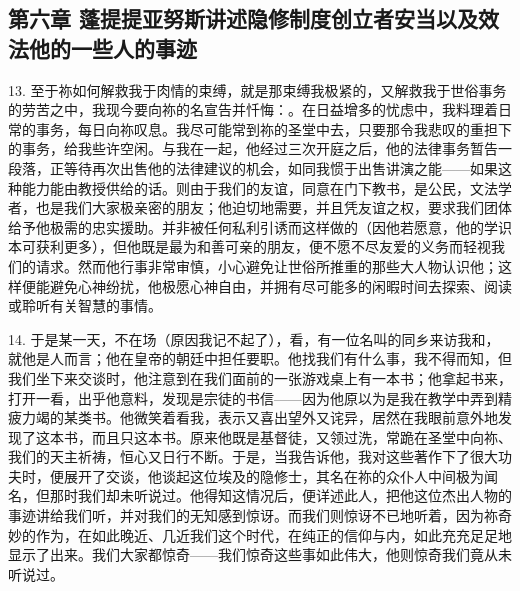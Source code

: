 
\subsection{第六章 蓬提提亚努斯讲述隐修制度创立者安当以及效法他的一些人的事迹}

13. 至于祢如何解救我于肉情的束缚，就是那束缚我极紧的，又解救我于世俗事务的劳苦之中，我现今要向祢的名宣告并忏悔：。在日益增多的忧虑中，我料理着日常的事务，每日向祢叹息。我尽可能常到祢的圣堂中去，只要那令我悲叹的重担下的事务，给我些许空闲。与我在一起，他经过三次开庭之后，他的法律事务暂告一段落，正等待再次出售他的法律建议的机会，如同我惯于出售讲演之能——如果这种能力能由教授供给的话。则由于我们的友谊，同意在门下教书，是公民，文法学者，也是我们大家极亲密的朋友；他迫切地需要，并且凭友谊之权，要求我们团体给予他极需的忠实援助。并非被任何私利引诱而这样做的（因他若愿意，他的学识本可获利更多），但他既是最为和善可亲的朋友，便不愿不尽友爱的义务而轻视我们的请求。然而他行事非常审慎，小心避免让世俗所推重的那些大人物认识他；这样便能避免心神纷扰，他极愿心神自由，并拥有尽可能多的闲暇时间去探索、阅读或聆听有关智慧的事情。\par

14. 于是某一天，不在场（原因我记不起了），看，有一位名叫的同乡来访我和，就他是人而言；他在皇帝的朝廷中担任要职。他找我们有什么事，我不得而知，但我们坐下来交谈时，他注意到在我们面前的一张游戏桌上有一本书；他拿起书来，打开一看，出乎他意料，发现是宗徒的书信——因为他原以为是我在教学中弄到精疲力竭的某类书。他微笑着看我，表示又喜出望外又诧异，居然在我眼前意外地发现了这本书，而且只这本书。原来他既是基督徒，又领过洗，常跪在圣堂中向祢、我们的天主祈祷，恒心又日行不断。于是，当我告诉他，我对这些著作下了很大功夫时，便展开了交谈，他谈起这位埃及的隐修士，其名在祢的众仆人中间极为闻名，但那时我们却未听说过。他得知这情况后，便详述此人，把他这位杰出人物的事迹讲给我们听，并对我们的无知感到惊讶。而我们则惊讶不已地听着，因为祢奇妙的作为，在如此晚近、几近我们这个时代，在纯正的信仰与内，如此充充足足地显示了出来。我们大家都惊奇——我们惊奇这些事如此伟大，他则惊奇我们竟从未听说过。\par

